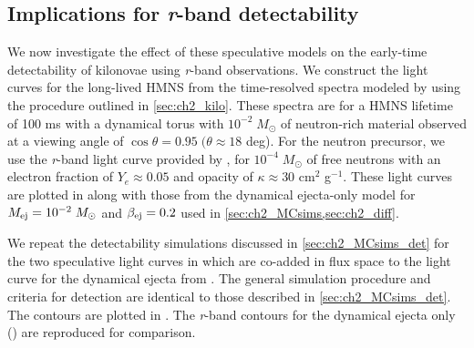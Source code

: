 \subsection{Implications for {\em r}-band detectability}
\label{sec:ch2_altkilo_det}
We now investigate the effect of these speculative models on the early-time detectability of kilonovae using {\em r}-band observations. We construct the light curves for the long-lived HMNS from the time-resolved spectra modeled by \citet{Kasen+15} using the procedure outlined in \cref{sec:ch2_kilo}. These spectra are for a HMNS lifetime of 100 ms with a dynamical torus with $10^{-2}\;M_{\odot}$ of neutron-rich material observed at a viewing angle of $\cos{\theta} = 0.95\; (\theta \approx 18$ deg). For the neutron precursor, we use the {\em r}-band light curve provided by \citet{Metzger+15}, for $10^{-4}\;M_{\odot}$ of free neutrons with an electron fraction of $Y_e \approx 0.05$ and opacity of $\kappa \approx 30$ cm$^2$ g$^{-1}$. These light curves are plotted in  along with those from the dynamical ejecta-only model for $M_{{\rm ej}} = 10^{-2}\;M_{\odot}$ and $\beta_{{\rm ej}} = 0.2$ used in \cref{sec:ch2_MCsims,sec:ch2_diff}.

\clearpage
We repeat the detectability simulations discussed in \cref{sec:ch2_MCsims_det} for the two speculative light curves in  which are co-added in flux space to the light curve for the dynamical ejecta from \citet{BarnesKasen13}. The general simulation procedure and criteria for detection are identical to those described in \cref{sec:ch2_MCsims_det}. The contours are plotted in . The {\em r}-band contours for the dynamical ejecta only () are reproduced for comparison.


